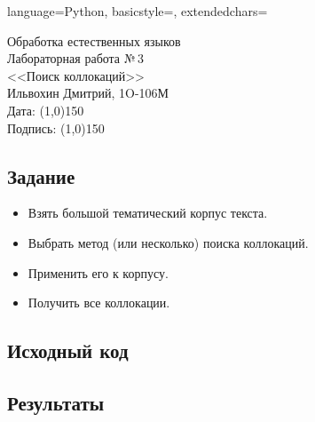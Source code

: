 \documentclass[12pt]{article}
\newcommand{\StudentName}{Ильвохин Дмитрий}
\newcommand{\Group}{1O-106М}
\newcommand{\CourseName}{Обработка естественных языков}
\newcommand{\LabNum}{3}
\newcommand{\Subject}{Поиск коллокаций}
\begin{document}
\lstset
{
        language=Python,
        basicstyle=\footnotesize,%
        extendedchars=\true
}

\begin{flushright}
\Large{
	\CourseName \\
	Лабораторная работа №\,\LabNum \\
	<<\Subject>> \\
  \StudentName, \Group \\
  Дата: \line(1,0){150} \\
  Подпись: \line(1,0){150} \\
}
\end{flushright}

\subsection*{Задание}
\begin{itemize}
  \item Взять большой тематический корпус текста.
  \item Выбрать метод (или несколько) поиска коллокаций.
  \item Применить его к корпусу.
  \item Получить все коллокации.
\end{itemize}

\subsection*{Исходный код}


\subsection*{Результаты}

\end{document}
